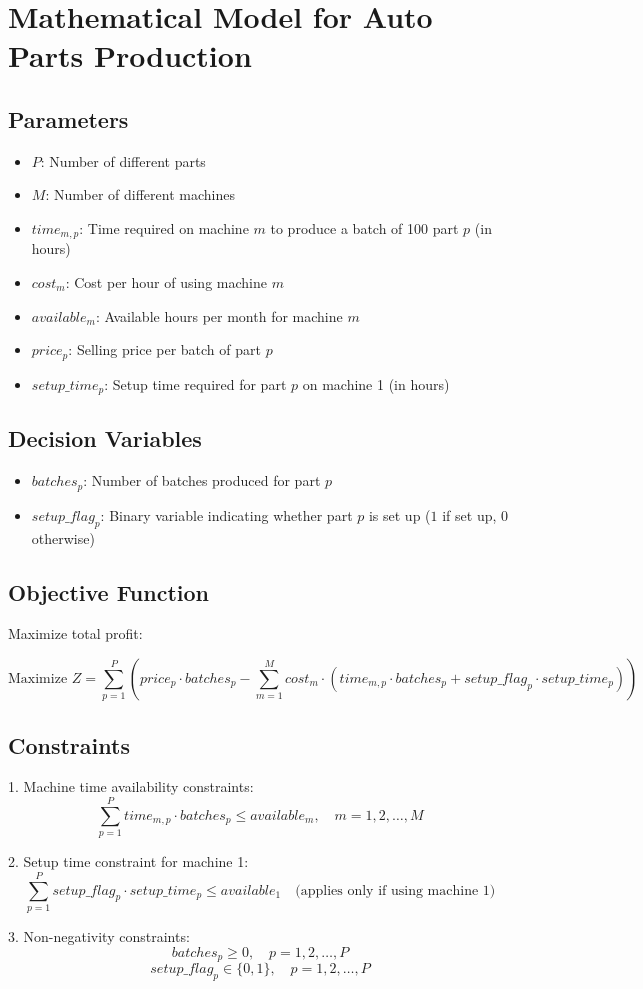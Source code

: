 \documentclass{article}
\begin{document}
\section*{Mathematical Model for Auto Parts Production}

\subsection*{Parameters}
\begin{itemize}
    \item $P$: Number of different parts
    \item $M$: Number of different machines
    \item $time_{m,p}$: Time required on machine $m$ to produce a batch of 100 part $p$ (in hours)
    \item $cost_{m}$: Cost per hour of using machine $m$
    \item $available_{m}$: Available hours per month for machine $m$
    \item $price_{p}$: Selling price per batch of part $p$
    \item $setup\_time_{p}$: Setup time required for part $p$ on machine 1 (in hours)
\end{itemize}

\subsection*{Decision Variables}
\begin{itemize}
    \item $batches_{p}$: Number of batches produced for part $p$
    \item $setup\_flag_{p}$: Binary variable indicating whether part $p$ is set up ($1$ if set up, $0$ otherwise)
\end{itemize}

\subsection*{Objective Function}
Maximize total profit:

\[
\text{Maximize } Z = \sum_{p=1}^{P} (price_{p} \cdot batches_{p} - \sum_{m=1}^{M} cost_{m} \cdot (time_{m,p} \cdot batches_{p} + setup\_flag_{p} \cdot setup\_time_{p}))
\]

\subsection*{Constraints}
1. Machine time availability constraints:
\[
\sum_{p=1}^{P} time_{m,p} \cdot batches_{p} \leq available_{m}, \quad m = 1, 2, \ldots, M
\]

2. Setup time constraint for machine 1:
\[
\sum_{p=1}^{P} setup\_flag_{p} \cdot setup\_time_{p} \leq available_{1} \quad \text{(applies only if using machine 1)}
\]

3. Non-negativity constraints:
\[
batches_{p} \geq 0, \quad p = 1, 2, \ldots, P
\]
\[
setup\_flag_{p} \in \{0, 1\}, \quad p = 1, 2, \ldots, P
\]
\end{document}

